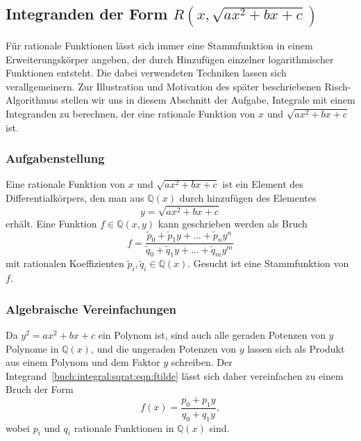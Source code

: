 %
%
%
\subsection{Integranden der Form $R(x,\sqrt{ax^2+bx+c})$
\label{buch:integral:subsection:rxy}}
Für rationale Funktionen lässt sich immer eine Stammfunktion in einem
Erweiterungskörper angeben, der durch Hinzufügen einzelner logarithmischer
Funktionen entsteht.
Die dabei verwendeten Techniken lassen sich verallgemeinern.
Zur Illustration und Motivation des später beschriebenen Risch-Algorithmus
stellen wir uns in diesem Abschnitt der Aufgabe, Integrale
mit einem Integranden zu berechnen, der eine rationale Funktion von $x$
und $\sqrt{ax^2+bx+c}$ ist.

%
%
\subsubsection{Aufgabenstellung}
Eine rationale Funktion von $x$ und $\sqrt{ax^2+bx+c}$ ist ein
Element des Differentialkörpers, den man aus $\mathbb{Q}(x)$ durch
hinzufügen des Elementes
\[
y=\sqrt{ax^2+bx+c}
\]
erhält.
Eine Funktion $f\in\mathbb{Q}(x,y)$ kann geschrieben werden als Bruch
\begin{equation}
f
=
\frac{
\tilde{p}_0 + \tilde{p}_1y + \dots + \tilde{p}_n y^n
}{
\tilde{q}_0 + \tilde{q}_1y + \dots + \tilde{q}_m y^m
}
\label{buch:integral:sqrat:eqn:ftilde}
\end{equation}
mit rationalen Koeffizienten $\tilde{p}_i,\tilde{q}_i\in\mathbb{Q}(x)$.
Gesucht ist eine Stammfunktion von $f$.

%
%
\subsubsection{Algebraische Vereinfachungen}
Da $y^2=ax^2+bx+c$ ein Polynom ist, sind auch alle geraden Potenzen
von $y$ Polynome in $\mathbb{Q}(x)$,
und die ungeraden Potenzen von $y$ lassen sich als Produkt aus einem
Polynom und dem Faktor $y$ schreiben.
Der Integrand~\eqref{buch:integral:sqrat:eqn:ftilde} 
lässt sich daher vereinfachen zu einem Bruch der Form
\begin{equation}
f(x)
=
\frac{p_0+p_1y}{q_0+q_1y},
\label{buch:integral:sqrat:eqn:moebius}
\end{equation}
wobei $p_i$ und $q_i$ rationale Funktionen in $\mathbb{Q}(x)$ sind.

%
%

